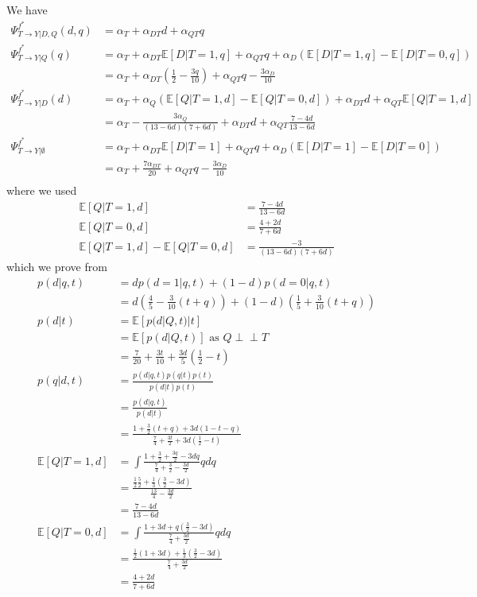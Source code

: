 \documentclass{article}
\theoremstyle{plain}
\theoremstyle{definition}
\theoremstyle{remark}
\newcommand{\effect}{\Psi}
\theoremstyle{mystyle}
\newcommand{\indep}{\perp\!\!\!\!\perp}
\begin{document}
We have
\begin{align*}
    \effect^{f^*}_{T \rightarrow Y | D, Q}(d,q) &= \alpha_T + \alpha_{DT}d + \alpha_{QT}q \\
    \effect^{f^*}_{T \rightarrow Y | Q}(q)
    &= \alpha_T + \alpha_{DT}\mathbb{E}[D|T=1,q] + \alpha_{QT}q + \alpha_D(\mathbb{E}[D|T=1,q] - \mathbb{E}[D|T=0,q])   \\
    &= \alpha_T + \alpha_{DT}(\frac{1}{2} - \frac{3q}{10}) + \alpha_{QT}q - \frac{3\alpha_D}{10} \\
    \effect^{f^*}_{T \rightarrow Y | D}(d) &= \alpha_T + \alpha_Q(\mathbb{E}[Q|T=1,d] - \mathbb{E}[Q|T=0,d] ) +  \alpha_{DT}d + \alpha_{QT}\mathbb{E}[Q|T=1,d] \\
    &= \alpha_T - \frac{3\alpha_Q}{(13 - 6d)(7 + 6d)} +  \alpha_{DT}d + \alpha_{QT}\frac{7 - 4d}{13 - 6d} \\
    \effect^{f^*}_{T \rightarrow Y | \emptyset}
    &= \alpha_T + \alpha_{DT}\mathbb{E}[D|T=1] + \alpha_{QT}q + \alpha_D(\mathbb{E}[D|T=1] - \mathbb{E}[D|T=0])   \\
        &= \alpha_T + \frac{7\alpha_{DT}}{20} + \alpha_{QT}q - \frac{3\alpha_D}{10}   \\
\end{align*}
where we used
\begin{align*}
    \mathbb{E}[Q|T=1,d] &= \frac{7 - 4d}{13 -6d} \\
    \mathbb{E}[Q|T=0,d] &= \frac{4 + 2d}{7 + 6d} \\
    \mathbb{E}[Q|T=1,d] - \mathbb{E}[Q|T=0,d] &= \frac{-3}{(13 - 6d)(7 + 6d)} 
\end{align*}
which we prove from
\begin{align*}
    p(d|q,t)
    &= dp(d=1|q,t) + (1-d)p(d=0|q,t) \\
    &= d(\frac{4}{5} - \frac{3}{10}(t+q)) + (1-d)(\frac{1}{5} + \frac{3}{10}(t+q) ) \\
    p(d|t)
    &= \mathbb{E}[p(d|Q,t) | t] \\
    &= \mathbb{E}[p(d|Q,t)] \text{ as } Q \indep T \\
    &= \frac{7}{20} + \frac{3t}{10} + \frac{3d}{5}(\frac{1}{2} - t) \\
    p(q|d,t)
    &= \frac{p(d|q,t)p(q|t)p(t)}{p(d|t)p(t)} \\
    &= \frac{p(d|q,t)}{p(d|t)} \\
    &= \frac{1 + \frac{3}{2}(t+q) + 3d(1 - t - q)}{\frac{7}{4} + \frac{3t}{2} + 3d(\frac{1}{2} - t)} \\
    \mathbb{E}[Q|T=1,d]
    &= \int \frac{1 + \frac{3}{2} + \frac{3q}{2} - 3dq}{\frac{7}{4} + \frac{3}{2} - \frac{3d}{2}}q dq \\
    &= \frac{\frac{1}{2}\frac{5}{2} + \frac{1}{3}(\frac{3}{2} - 3d)}{\frac{13}{4} - \frac{3d}{2}} \\
    &= \frac{7 - 4d}{13 - 6d} \\
    \mathbb{E}[Q|T=0,d]
    &= \int \frac{1 + 3d + q(\frac{3}{2} - 3d)}{\frac{7}{4} + \frac{3d}{2}}q dq \\
    &= \frac{\frac{1}{2}(1 + 3d) + \frac{1}{3}(\frac{3}{2} - 3d)}{\frac{7}{4} + \frac{3d}{2}} \\
    &= \frac{4 + 2d}{7 + 6d}
\end{align*}
\end{document}
